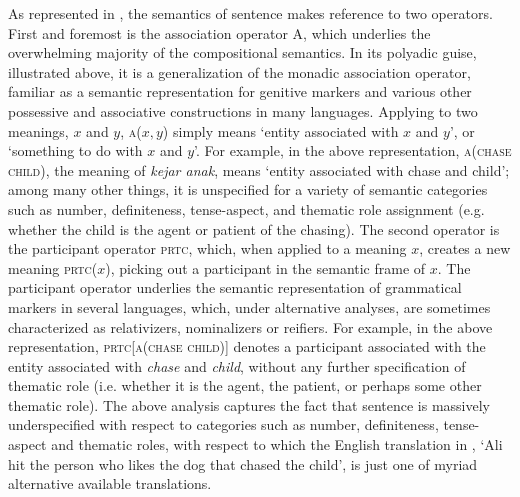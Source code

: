 \documentclass[output=paper,colorlinks,citecolor=brown
]{langscibook}
\begin{document}
As represented in , the semantics of sentence  makes reference to two operators. First and foremost is the association operator A, which underlies the overwhelming majority of the compositional semantics. In its polyadic guise, illustrated above, it is a generalization of the monadic association operator, familiar as a semantic representation for genitive markers and various other possessive and associative constructions in many languages. Applying to two meanings, $x$ and $y$, \textsc{a}($x,y$) simply means `entity associated with $x$ and $y$', or `something to do with $x$ and $y$'. For example, in the above representation, \textsc{a(chase child)}, the meaning of \textit{kejar anak}, means `entity associated with chase and child'; among many other things, it is unspecified for a variety of semantic categories such as number, definiteness, tense-aspect, and thematic role assignment (e.g. whether the child is the agent or patient of the chasing). The second operator is the participant operator \textsc{prtc}, which, when applied to a meaning $x$, creates a new meaning \textsc{prtc}($x$), picking out a participant in the semantic frame of $x$. The participant operator underlies the semantic representation of grammatical markers in several languages, which, under alternative analyses, are sometimes characterized as relativizers, nominalizers or reifiers. For example, in the above representation, \textsc{prtc[a(chase child)]} denotes a participant associated with the entity associated with \textit{chase} and \textit{child}, without any further specification of thematic role (i.e. whether it is the agent, the patient, or perhaps some other thematic role). The above analysis captures the fact that sentence  is massively underspecified with respect to categories such as number, definiteness, tense-aspect and thematic roles, with respect to which the English translation in , `Ali hit the person who likes the dog that chased the child', is just one of myriad alternative available translations.
\end{document}
